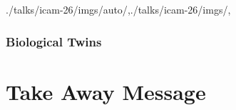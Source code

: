\begin{bibliographysection}
\begin{graphicspathcontext}{{./talks/icam-26/imgs/auto/},{./talks/icam-26/imgs/},\old}
\section{Biological Twins}
\localized

\part{Take Away Message}

\localized
\localized


\end{graphicspathcontext}
\end{bibliographysection}

\endinput
